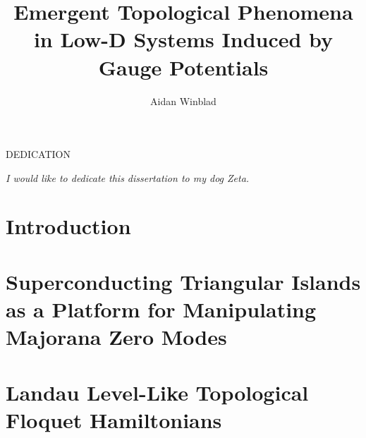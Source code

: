 \documentclass[12pt,doctor]{thesis}
\title{Emergent Topological Phenomena in Low-D Systems Induced by Gauge Potentials}
\author{Aidan Winblad}
\begin{document}
\frontmatter

\maketitle              %
\makemycopyright        %
\makeabstract           %
\makeacknowledgements   %

\begin{flatcenter} %

    DEDICATION

    \vfill %

    \noindent \textit{I would like to dedicate this dissertation to my dog Zeta.}
    \vfill %
\end{flatcenter}
\newpage

\tableofcontents    %
\listoftables       %
\listoffigures      %

\mainmatter %

\chapter{Introduction}






\chapter{Superconducting Triangular Islands as a Platform for Manipulating Majorana Zero Modes}







\chapter{Landau Level-Like Topological Floquet Hamiltonians}
\end{document}

